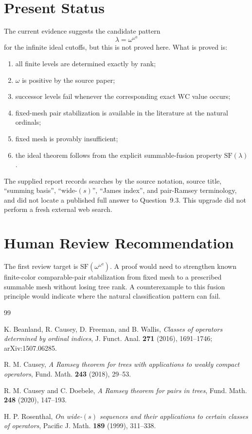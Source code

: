 \documentclass[11pt]{article}
\theoremstyle{definition}
\theoremstyle{remark}
\newcommand{\WC}{\mathrm{WC}}
\begin{document}
\section{Present Status}

The current evidence suggests the candidate pattern
\[
   \lambda=\omega^{\omega^\eta}
\]
for the infinite ideal cutoffs, but this is not proved here.  What is proved
is:
\begin{enumerate}[label=\textup{(\arabic*)}]
\item all finite levels are determined exactly by rank;
\item \(\omega\) is positive by the source paper;
\item successor levels fail whenever the corresponding exact \(\WC\) value
      occurs;
\item fixed-mesh pair stabilization is available in the literature at the
      natural ordinals;
\item fixed mesh is provably insufficient;
\item the ideal theorem follows from the explicit summable-fusion property
      \(\mathrm{SF}(\lambda)\).
\end{enumerate}

The supplied report records searches by the source notation, source title,
``summing basis'', ``wide-\((s)\)'', ``James index'', and pair-Ramsey
terminology, and did not locate a published full answer to Question~9.3.
This upgrade did not perform a fresh external web search.

\section{Human Review Recommendation}

The first review target is \(\mathrm{SF}(\omega^{\omega^\eta})\).  A proof
would need to strengthen known finite-color comparable-pair stabilization
from fixed mesh to a prescribed summable mesh without losing tree rank.  A
counterexample to this fusion principle would indicate where the natural
classification pattern can fail.

\begin{thebibliography}{99}

K. Beanland, R. Causey, D. Freeman, and B. Wallis,
\emph{Classes of operators determined by ordinal indices},
J. Funct. Anal. \textbf{271} (2016), 1691--1746; arXiv:1507.06285.

R. M. Causey,
\emph{A Ramsey theorem for trees with applications to weakly compact operators},
Fund. Math. \textbf{243} (2018), 29--53.

R. M. Causey and C. Doebele,
\emph{A Ramsey theorem for pairs in trees},
Fund. Math. \textbf{248} (2020), 147--193.

H. P. Rosenthal,
\emph{On wide-\((s)\) sequences and their applications to certain classes of
operators},
Pacific J. Math. \textbf{189} (1999), 311--338.

\end{thebibliography}
\end{document}
